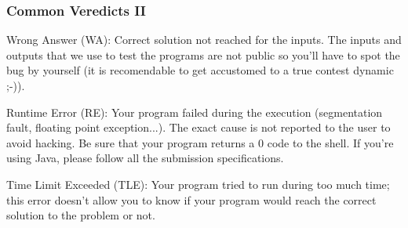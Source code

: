 \documentclass{beamer}
\begin{document}
\begin{frame}
	\frametitle {Common Veredicts II}
	
	\begin{block}{Wrong Answer (WA):}
	Correct solution not reached for the inputs. 
	The inputs and outputs that we use to test the programs are not public so you'll have to spot the bug by yourself (it is recomendable to get accustomed to a true contest dynamic ;-)). 
	\end{block}
	
	\begin{block}{Runtime Error (RE):}
	Your program failed during the execution (segmentation fault, floating point exception...). The exact cause is not reported to the user to avoid hacking. Be sure that your program returns a 0 code to the shell. If you're using Java, please follow all the submission specifications.
	\end{block}
	
	\begin{block}{Time Limit Exceeded (TLE):}
	Your program tried to run during too much time; this error doesn't allow you to know if your program would reach the correct solution to the problem or not.
	\end{block}
	
\end{frame}
	
	
	
	
	

%	
	
\end{document}
